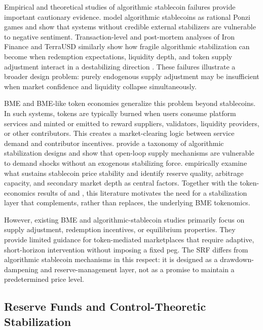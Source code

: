 \documentclass[a4paper,fleqn]{cas-dc}
\begin{document}
Empirical and theoretical studies of algorithmic stablecoin failures provide important cautionary evidence. \citet{wang2023rational} model algorithmic stablecoins as rational Ponzi games and show that systems without credible external stabilizers are vulnerable to negative sentiment. Transaction-level and post-mortem analyses of Iron Finance and TerraUSD similarly show how fragile algorithmic stabilization can become when redemption expectations, liquidity depth, and token supply adjustment interact in a destabilizing direction \citep{castello2025digital,gregory2024break,terra_anatomy}. These failures illustrate a broader design problem: purely endogenous supply adjustment may be insufficient when market confidence and liquidity collapse simultaneously.

BME and BME-like token economies generalize this problem beyond stablecoins. In such systems, tokens are typically burned when users consume platform services and minted or emitted to reward suppliers, validators, liquidity providers, or other contributors. This creates a market-clearing logic between service demand and contributor incentives. \citet{klages2020stablecoins} provide a taxonomy of algorithmic stabilization designs and show that open-loop supply mechanisms are vulnerable to demand shocks without an exogenous stabilizing force. \citet{lyons2023stablecoins} empirically examine what sustains stablecoin price stability and identify reserve quality, arbitrage capacity, and secondary market depth as central factors. Together with the token-economics results of \citet{cong2021tokenomics} and \citet{sockin2023decentralization}, this literature motivates the need for a stabilization layer that complements, rather than replaces, the underlying BME tokenomics.

However, existing BME and algorithmic-stablecoin studies primarily focus on supply adjustment, redemption incentives, or equilibrium properties. They provide limited guidance for token-mediated marketplaces that require adaptive, short-horizon intervention without imposing a fixed peg. The SRF differs from algorithmic stablecoin mechanisms in this respect: it is designed as a drawdown-dampening and reserve-management layer, not as a promise to maintain a predetermined price level.

\subsection{Reserve Funds and Control-Theoretic Stabilization}
\end{document}
